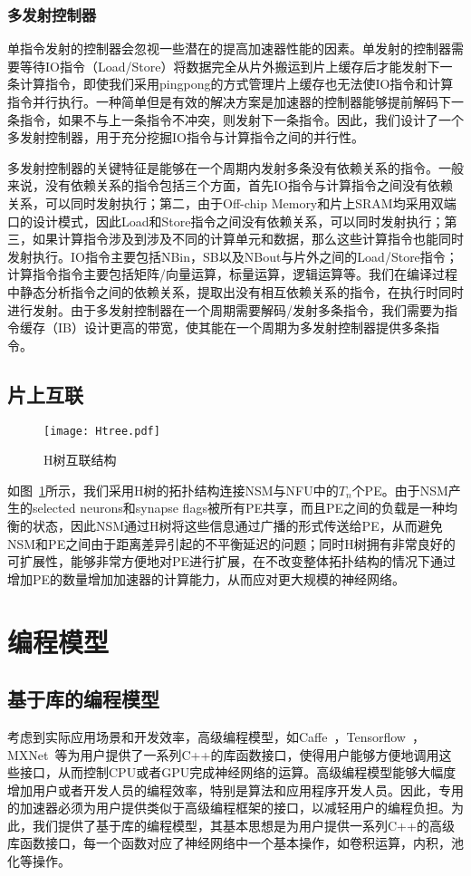 \subsubsection{多发射控制器}
单指令发射的控制器会忽视一些潜在的提高加速器性能的因素。单发射的控制器需要等待IO指令（Load/Store）将数据完全从片外搬运到片上缓存后才能发射下一条计算指令，即使我们采用pingpong的方式管理片上缓存也无法使IO指令和计算指令并行执行。一种简单但是有效的解决方案是加速器的控制器能够提前解码下一条指令，如果不与上一条指令不冲突，则发射下一条指令。因此，我们设计了一个多发射控制器，用于充分挖掘IO指令与计算指令之间的并行性。

多发射控制器的关键特征是能够在一个周期内发射多条没有依赖关系的指令。一般来说，没有依赖关系的指令包括三个方面，首先IO指令与计算指令之间没有依赖关系，可以同时发射执行；第二，由于Off-chip Memory和片上SRAM均采用双端口的设计模式，因此Load和Store指令之间没有依赖关系，可以同时发射执行；第三，如果计算指令涉及到涉及不同的计算单元和数据，那么这些计算指令也能同时发射执行。IO指令主要包括NBin，SB以及NBout与片外之间的Load/Store指令；计算指令指令主要包括矩阵/向量运算，标量运算，逻辑运算等。我们在编译过程中静态分析指令之间的依赖关系，提取出没有相互依赖关系的指令，在执行时同时进行发射。由于多发射控制器在一个周期需要解码/发射多条指令，我们需要为指令缓存（IB）设计更高的带宽，使其能在一个周期为多发射控制器提供多条指令。

\subsection{片上互联}

\begin{figure}[h]
\centering
\texttt{[image: Htree.pdf]}
\caption{H树互联结构}
\label{fig:Htree}
\end{figure}

如图~\ref{fig:Htree}所示，我们采用H树的拓扑结构连接NSM与NFU中的$T_n$个PE。由于NSM产生的selected neurons和synapse flags被所有PE共享，而且PE之间的负载是一种均衡的状态，因此NSM通过H树将这些信息通过广播的形式传送给PE，从而避免NSM和PE之间由于距离差异引起的不平衡延迟的问题；同时H树拥有非常良好的可扩展性，能够非常方便地对PE进行扩展，在不改变整体拓扑结构的情况下通过增加PE的数量增加加速器的计算能力，从而应对更大规模的神经网络。


\section{编程模型}

\subsection{基于库的编程模型}
考虑到实际应用场景和开发效率，高级编程模型，如Caffe~\cite{jia2014caffe}，Tensorflow~\cite{abadi2016tensorflow}， MXNet~\cite{chen2015mxnet}等为用户提供了一系列C++的库函数接口，使得用户能够方便地调用这些接口，从而控制CPU或者GPU完成神经网络的运算。高级编程模型能够大幅度增加用户或者开发人员的编程效率，特别是算法和应用程序开发人员。因此，专用的加速器必须为用户提供类似于高级编程框架的接口，以减轻用户的编程负担。为此，我们提供了基于库的编程模型，其基本思想是为用户提供一系列C++的高级库函数接口，每一个函数对应了神经网络中一个基本操作，如卷积运算，内积，池化等操作。

